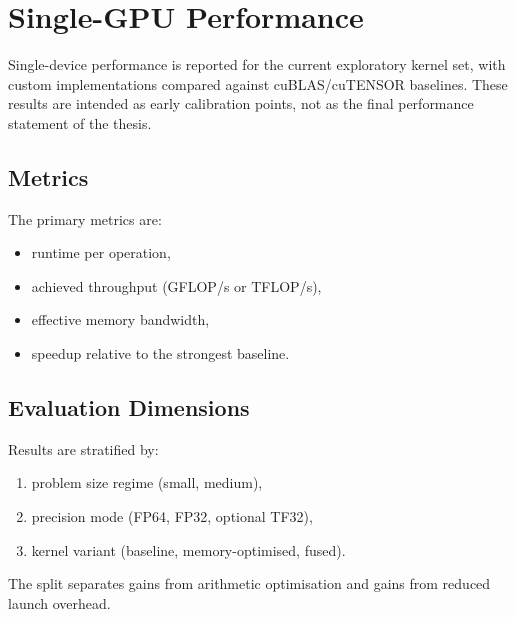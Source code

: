 \section{Single-GPU Performance}\label{sec:single-gpu}

Single-device performance is reported for the current exploratory kernel set,
with custom implementations compared against cuBLAS/cuTENSOR baselines. These
results are intended as early calibration points, not as the final performance
statement of the thesis.

\subsection{Metrics}

The primary metrics are:

\begin{itemize}
  \item runtime per operation,
  \item achieved throughput (GFLOP/s or TFLOP/s),
  \item effective memory bandwidth,
  \item speedup relative to the strongest baseline.
\end{itemize}

\subsection{Evaluation Dimensions}

Results are stratified by:

\begin{enumerate}
  \item problem size regime (small, medium),
  \item precision mode (FP64, FP32, optional TF32),
  \item kernel variant (baseline, memory-optimised, fused).
\end{enumerate}

The split separates gains from arithmetic optimisation and gains from reduced
launch overhead.
